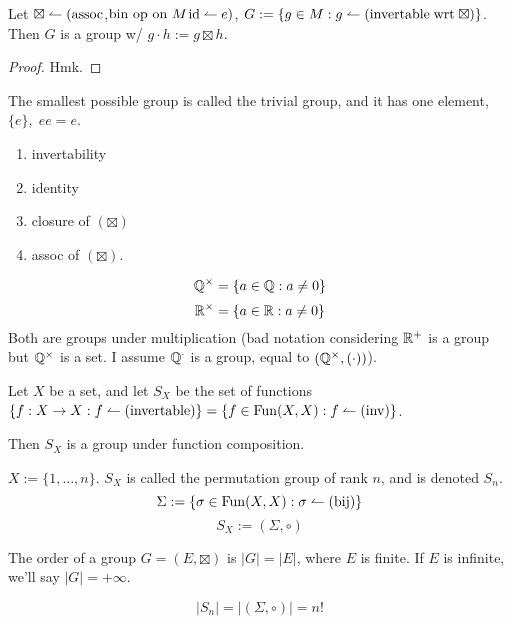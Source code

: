\documentclass[12pt]{article}
\newcommand{\gop}[0]{\boxtimes}
\begin{document}
\bbox
\begin{lem}
  Let \(\gop\is(\T{assoc}\),\(\text{bin op on }M\)\(\mathrm{id}\leftharpoonup e)\),
  \(G:=\{g\in M:g\leftharpoonup(\mathrm{invertable\;wrt\;\boxtimes})\}\). Then
  \(G\) is a group w/ \(g\cdot h:=g\gop h\).
\end{lem}
\ebox

\bboxproof
\begin{proof}
  Hmk.
\end{proof}
\ebox

The smallest possible group is called the trivial group, and it has one
element, \(\{e\},\;ee=e\).

\begin{enumerate}
  \item invertability
  \item identity
  \item closure of \((\gop)\)
  \item assoc of \((\gop)\).
\end{enumerate}


\bboxex
\[\mathbb Q^\times=\{a\in\mathbb Q:a\neq0\}\]
\[\mathbb R^\times=\{a\in\mathbb R:a\neq0\}\]
Both are groups under multiplication (bad notation considering \(\mathbb R^+\)
is a group but \(\mathbb Q^\times\) is a set. I assume \(\mathbb Q^\cdot\) is a group, equal
to \((\mathbb Q^\times,(\cdot))\)).
\ebox

\bbox
\begin{coro}
  Let \(X\) be a set, and let \(S_X\) be the set of functions
  \(\{f:X\to X:f\leftharpoonup(\mathrm{invertable})\}=\{f\in\mathrm{Fun}(X,X):f\leftharpoonup(\mathrm{inv})\}\).

  Then \(S_X\) is a group under function composition.
\end{coro}
\ebox

\bbox
\begin{defn}\label{defn:perm_group}
  \(X:=\{1,\dots,n\}\). \(S_X\) is called the permutation group of rank \(n\),
  and is denoted \(S_n\).
  \bboxnote
  \[\Sigma:=\{\sigma\in\mathrm{Fun}(X,X):\sigma\leftharpoonup(\mathrm{bij})\}\]
  \[S_X:=(\Sigma,\circ)\]
  \ebox
\end{defn}
\ebox

\bbox
\begin{defn}[Order]\label{defn:order}
  The order of a group \(G=(E,\gop)\) is \(|G|=|E|\), where \(E\) is finite. If
  \(E\) is infinite, we'll say \(|G|=+\infty\).
\end{defn}
\ebox


\bboxex
\[|S_n|=|(\Sigma,\circ)|=n!\]
\ebox

\end{document}
